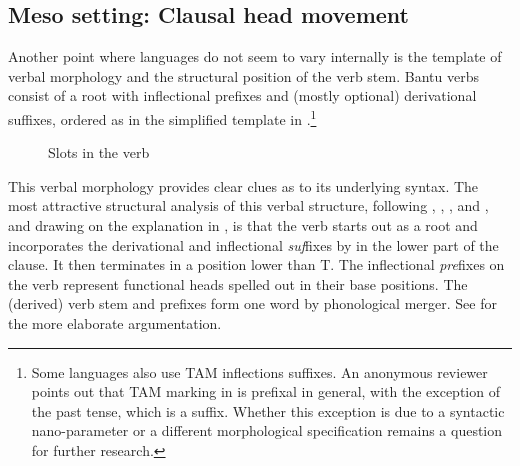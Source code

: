 \documentclass[output=paper]{langsci/langscibook}
\begin{document}
\subsection{Meso setting: Clausal head movement}\label{sub:3.2.2}

Another point where  languages do not seem to vary internally is the
template of verbal morphology and the structural position of the verb stem.
Bantu verbs consist of a root with inflectional prefixes and (mostly optional)
derivational suffixes, ordered as in the simplified template in
.\footnote{Some  languages also use \gls{TAM} inflections
    suffixes. An anonymous reviewer points out that \gls{TAM} marking in
     is prefixal in general, with the exception of the past tense,
    which is a suffix.  Whether this exception is due to a syntactic
nano-parameter or a different morphological specification remains a question
for further research.}

\begin{figure}
    \caption{Slots in the  verb}\label{fig:vdwal:1}
\end{figure}

This verbal morphology provides clear clues as to its underlying syntax. The
most attractive structural analysis of this verbal structure, following
\citet{Myers1990}, \citet{Julien2002}, \citet{Kinyalolo2003},
\citet{Carstens2005} and \citet{Buell2005}, and drawing on the explanation in
\Textcite{vanderWal2009}, is that the verb starts out as a root and incorporates
the derivational and inflectional \emph{suf}fixes by  in the
lower part of the clause.  It then terminates in a position lower than T. The
inflectional \emph{pre}fixes on the verb represent functional heads spelled out
in their base positions. The (derived) verb stem and prefixes form one word by
phonological merger. See \citet{Julien2002} for the more elaborate
argumentation.\largerpage
\end{document}
